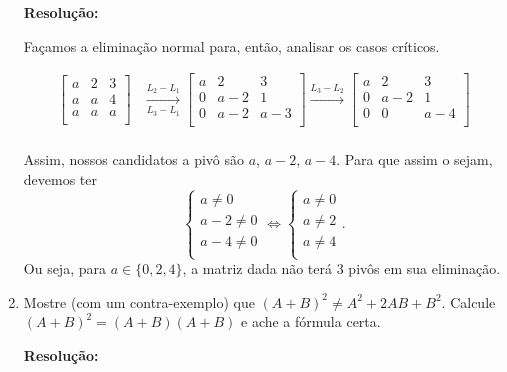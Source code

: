 \documentclass[leqno]{article}
\begin{document}
\begin{enumerate}
    \textbf{Resolução:}
    
    Façamos a eliminação normal para, então, analisar os casos críticos.
    
    \begin{align*}
    \begin{bmatrix}
    a & 2 & 3\\
    a & a & 4\\
    a & a & a\\
    \end{bmatrix}&\xrightarrow[L_3-L_1]{L_2-L_1}\begin{bmatrix}
    a & 2 & 3\\
    0 & a-2 & 1\\
    0 & a-2 & a-3\\
    \end{bmatrix}\xrightarrow{L_3-L_2}\begin{bmatrix}
    a & 2 & 3\\
    0 & a-2 & 1\\
    0 & 0 & a-4\\
    \end{bmatrix}\\
    \end{align*}
    
    Assim, nossos candidatos a pivô são $a$, $a-2$, $a-4$. Para que assim o sejam, devemos ter $$\begin{cases}
    a\neq0\\
    a-2\neq0\\
    a-4\neq0\\
    \end{cases}\iff\begin{cases}
    a\neq0\\
    a\neq2\\
    a\neq4\\
    \end{cases}\text{.}$$ Ou seja, para $a\in\{0,2,4\}$, a matriz dada não terá $3$ pivôs em sua eliminação.
    
    \item Mostre (com um contra-exemplo) que $(A+B)^2 \neq A^2 + 2AB +B^2$. Calcule $(A+B)^2 = (A+B)(A+B)$ e ache a fórmula certa.
    
    \textbf{Resolução:}
    

\end{enumerate}
\end{document}
